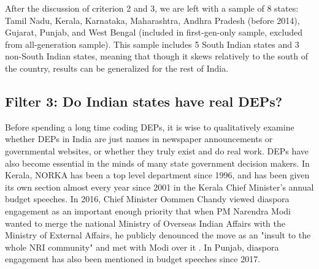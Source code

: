 \documentclass[12pt]{article}
\let\oldsubsection\subsection
\renewcommand{\subsection}{\FloatBarrier\oldsubsection}
\begin{document}
After the discussion of criterion 2 and 3, we are left with a sample of 8 states: Tamil Nadu, Kerala, Karnataka, Maharashtra, Andhra Pradesh (before 2014), Gujarat, Punjab, and West Bengal (included in first-gen-only sample, excluded from all-generation sample). This sample includes 5 South Indian states and 3 non-South Indian states, meaning that though it skews relatively to the south of the country, results can be generalized for the rest of India.

\subsection{Filter 3: Do Indian states have real DEPs?}\label{ss:are there deps}
    Before spending a long time coding DEPs, it is wise to qualitatively examine whether DEPs in India are just names in newspaper announcements or governmental websites, or whether they truly exist and do real work. 
   DEPs have also become essential in the minds of many state government decision makers. In Kerala, NORKA has been a top level department since 1996, and has been given its own section almost every year since 2001 in the Kerala Chief Minister's annual budget speeches. In 2016, Chief Minister Oommen Chandy viewed diaspora engagement as an important enough priority that when PM Narendra Modi wanted to merge the national Ministry of Overseas Indian Affairs with the Ministry of External Affairs, he publicly denounced the move as an "insult to the whole NRI community" and met with Modi over it \citep{ttn_team_kerala_2016}. In Punjab, diaspora engagement has also been mentioned in budget speeches since 2017. 
\end{document}

